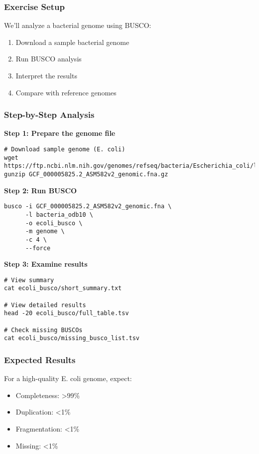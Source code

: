 \subsubsection{Exercise Setup}
We'll analyze a bacterial genome using BUSCO:

\begin{enumerate}
    \item Download a sample bacterial genome
    \item Run BUSCO analysis
    \item Interpret the results
    \item Compare with reference genomes
\end{enumerate}

\subsubsection{Step-by-Step Analysis}

\textbf{Step 1: Prepare the genome file}
\begin{verbatim}
# Download sample genome (E. coli)
wget https://ftp.ncbi.nlm.nih.gov/genomes/refseq/bacteria/Escherichia_coli/latest_assembly_versions/GCF_000005825.2_ASM582v2/GCF_000005825.2_ASM582v2_genomic.fna.gz
gunzip GCF_000005825.2_ASM582v2_genomic.fna.gz
\end{verbatim}

\textbf{Step 2: Run BUSCO}
\begin{verbatim}
busco -i GCF_000005825.2_ASM582v2_genomic.fna \
      -l bacteria_odb10 \
      -o ecoli_busco \
      -m genome \
      -c 4 \
      --force
\end{verbatim}

\textbf{Step 3: Examine results}
\begin{verbatim}
# View summary
cat ecoli_busco/short_summary.txt

# View detailed results
head -20 ecoli_busco/full_table.tsv

# Check missing BUSCOs
cat ecoli_busco/missing_busco_list.tsv
\end{verbatim}

\subsubsection{Expected Results}
For a high-quality E. coli genome, expect:
\begin{itemize}
    \item Completeness: >99\%
    \item Duplication: <1\%
    \item Fragmentation: <1\%
    \item Missing: <1\%
\end{itemize}


